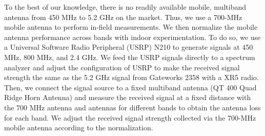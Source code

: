To the best of our knowledge, there is no readily available mobile, multiband antenna from
450 MHz to 5.2 GHz on the market. Thus, we use a 700-MHz mobile antenna to perform in-field
measurements. We then normalize the mobile antenna performance across bands with indoor 
experimentation. To do so, we use a Universal Software Radio Peripheral (USRP) N210 to 
generate signals at 450 MHz, 800 MHz, and 2.4 GHz. We feed the USRP signals directly
to a spectrum analyzer and adjust the configuration of USRP to make the received signal 
strength the same as the 5.2 GHz signal from Gateworks 2358 with a XR5 radio. Then, we connect 
the signal source to a fixed multiband antenna (QT 400 Quad Ridge Horn Antenna) and measure the
received signal at a fixed distance with the 700 MHz antenna and antennas for different bands
to obtain the antenna loss for each band. We adjust the received signal strength
collected via the 700-MHz mobile antenna according to the normalization.




